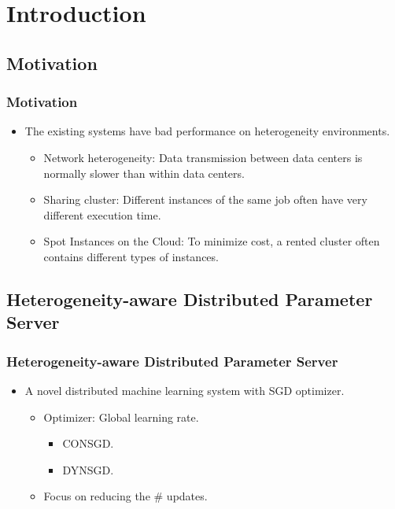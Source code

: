 \section{Introduction}

\subsection{Motivation}
\begin{frame}
    \frametitle{Motivation}
	\begin{itemize}
		\item The existing systems have bad performance on heterogeneity environments.
			\begin{itemize}
				\item Network heterogeneity: Data transmission between data centers is normally slower than within data centers.
				\item Sharing cluster: Different instances of the same job often have very different execution time. 
				\item Spot Instances on the Cloud: To minimize cost, a rented cluster often contains different types of instances. 
			\end{itemize}
	\end{itemize} 
\end{frame}

\subsection{Heterogeneity-aware Distributed Parameter Server}
\begin{frame}
    \frametitle{Heterogeneity-aware Distributed Parameter Server}
	\begin{itemize}
		\item A novel distributed machine learning system with SGD optimizer.
			\begin{itemize}
				\item Optimizer: Global learning rate.
					\begin{itemize}
						\item CONSGD.
						\item DYNSGD.
					\end{itemize}
				\item Focus on reducing the \# updates.
			\end{itemize}
	\end{itemize} 
\end{frame}


